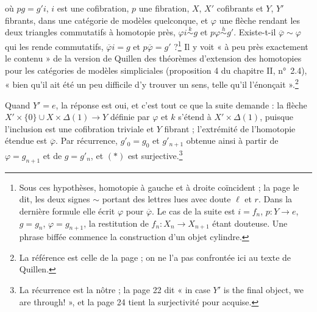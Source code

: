 \documentclass[11pt,a4paper]{article}
\begin{document}

où $p g = g' i$, $i$ est une cofibration, $p$ une fibration, $X$, $X'$
cofibrants et $Y$, $Y'$ fibrants, dans une catégorie de modèles quelconque,
et $\varphi$ une flèche rendant les deux triangles commutatifs à homotopie
près, $\varphi i \overset{k}{\sim} g$ et $p \varphi \overset{h}{\sim} g'$.
Existe-t-il $\overline{\varphi} \sim \varphi$ qui les rende commutatifs,
$\overline{\varphi} i = g$ et $p \overline{\varphi} = g'$ ?\footnote{Sous ces
hypothèses, homotopie à gauche et à droite coïncident ; la page le dit, les
deux signes $\sim$ portant des lettres lues avec doute $\ell$ et $r$. Dans la
dernière formule elle écrit $\varphi$ pour $\overline{\varphi}$. Le cas de la
suite est $i = f_{n}$, $p : Y \to e$, $g = g_{n}$, $\varphi = g_{n+1}$, la
restitution de $f_{n} : X_{n} \to X_{n+1}$ étant douteuse. Une phrase biffée
commence la construction d'un objet cylindre.} Il y voit « à peu près
exactement le contenu » de la version de Quillen des théorèmes d'extension
des homotopies pour les catégories de modèles simpliciales (proposition 4 du
chapitre II, n°~2.4), « bien qu'il ait été un peu difficile
d'y trouver un sens, telle qu'il l'énonçait ».\footnote{La référence est celle
de la page ; on ne l'a pas confrontée ici au texte de Quillen.}

Quand $Y' = e$, la réponse est oui, et c'est tout ce que la suite demande : la
flèche $X' \times \{0\} \cup X \times \Delta(1) \to Y$ définie par $\varphi$ et
$k$ s'étend à $X' \times \Delta(1)$, puisque l'inclusion est une cofibration
triviale et $Y$ fibrant ; l'extrémité de l'homotopie étendue est
$\overline{\varphi}$. Par récurrence, $g'_{0} = g_{0}$ et $g'_{n+1}$ obtenue
ainsi à partir de $\varphi = g_{n+1}$ et de $g = g'_{n}$, et $(*)$ est
surjective.\footnote{La récurrence est la nôtre ; la page 22 dit « in case
$Y'$ is the final object, we are through! », et la page 24 tient la
surjectivité pour acquise.}
\end{document}
